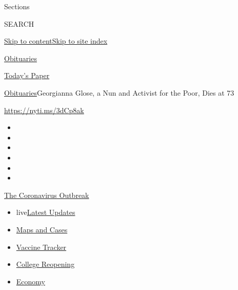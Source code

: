Sections

SEARCH

\protect\hyperlink{site-content}{Skip to
content}\protect\hyperlink{site-index}{Skip to site index}

\href{https://www.nytimes.com/section/obituaries}{Obituaries}

\href{https://myaccount.nytimes.com/auth/login?response_type=cookie\&client_id=vi}{}

\href{https://www.nytimes.com/section/todayspaper}{Today's Paper}

\href{/section/obituaries}{Obituaries}\textbar{}Georgianna Glose, a Nun
and Activist for the Poor, Dies at 73

\url{https://nyti.ms/3dCp8ak}

\begin{itemize}
\item
\item
\item
\item
\item
\item
\end{itemize}

\href{https://www.nytimes.com/news-event/coronavirus?action=click\&pgtype=Article\&state=default\&region=TOP_BANNER\&context=storylines_menu}{The
Coronavirus Outbreak}

\begin{itemize}
\tightlist
\item
  live\href{https://www.nytimes.com/2020/08/03/world/coronavirus-covid-19.html?action=click\&pgtype=Article\&state=default\&region=TOP_BANNER\&context=storylines_menu}{Latest
  Updates}
\item
  \href{https://www.nytimes.com/interactive/2020/us/coronavirus-us-cases.html?action=click\&pgtype=Article\&state=default\&region=TOP_BANNER\&context=storylines_menu}{Maps
  and Cases}
\item
  \href{https://www.nytimes.com/interactive/2020/science/coronavirus-vaccine-tracker.html?action=click\&pgtype=Article\&state=default\&region=TOP_BANNER\&context=storylines_menu}{Vaccine
  Tracker}
\item
  \href{https://www.nytimes.com/2020/08/02/us/covid-college-reopening.html?action=click\&pgtype=Article\&state=default\&region=TOP_BANNER\&context=storylines_menu}{College
  Reopening}
\item
  \href{https://www.nytimes.com/live/2020/08/03/business/stock-market-today-coronavirus?action=click\&pgtype=Article\&state=default\&region=TOP_BANNER\&context=storylines_menu}{Economy}
\end{itemize}

